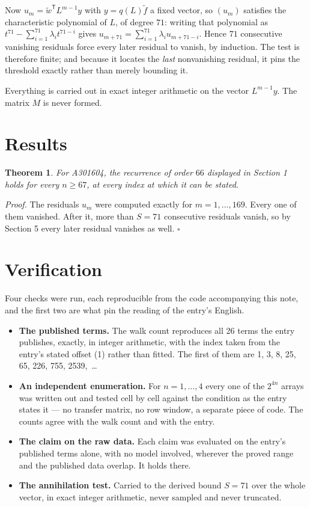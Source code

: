 \documentclass[11pt]{article}
\newtheorem{theorem}{Theorem}
\theoremstyle{definition}
\begin{document}
Now $u_m = \tilde w^{\mathsf T} L^{m-1} y$ with $y = q(L)\tilde f$ a fixed vector, so $(u_m)$ satisfies the characteristic polynomial of $L$, of degree $71$: writing that polynomial as $t^{71} - \sum_{i=1}^{71} \lambda_i t^{71-i}$ gives $u_{m+71} = \sum_{i=1}^{71} \lambda_i u_{m+71-i}$. Hence $71$ consecutive vanishing residuals force every later residual to vanish, by induction. The test is therefore finite; and because it locates the {\itshape last} nonvanishing residual, it pins the threshold exactly rather than merely bounding it.

Everything is carried out in exact integer arithmetic on the vector $L^{m-1}y$. The matrix $M$ is never formed.

\section{Results}

\begin{theorem} For A301604, the recurrence of order $66$ displayed in Section 1 holds for every $n \ge 67$, at every index at which it can be stated.\end{theorem}

{\itshape Proof.} The residuals $u_m$ were computed exactly for $m = 1,\dots,169$. Every one of them vanished. After it, more than $S = 71$ consecutive residuals vanish, so by Section 5 every later residual vanishes as well. $\square$

\section{Verification}

Four checks were run, each reproducible from the code accompanying this note, and the first two are what pin the reading of the entry's English.

\begin{itemize}

\item {\bfseries The published terms.} The walk count reproduces all 26 terms the entry publishes, exactly, in integer arithmetic, with the index taken from the entry's stated offset (1) rather than fitted. The first of them are 1, 3, 8, 25, 65, 226, 755, 2539,~\dots

\item {\bfseries An independent enumeration.} For $n = 1,\dots,4$ every one of the $2^{4n}$ arrays was written out and tested cell by cell against the condition as the entry states it --- no transfer matrix, no row window, a separate piece of code. The counts agree with the walk count and with the entry.

\item {\bfseries The claim on the raw data.} Each claim was evaluated on the entry's published terms alone, with no model involved, wherever the proved range and the published data overlap. It holds there.

\item {\bfseries The annihilation test.} Carried to the derived bound $S = 71$ over the whole vector, in exact integer arithmetic, never sampled and never truncated.

\end{itemize}
\end{document}
